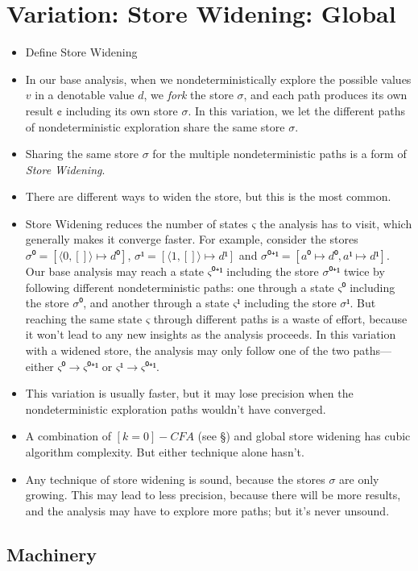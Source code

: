 \documentclass[12pt, oneside]{book}
\begin{document}
\section{Variation: Store Widening: Global}

\begin{itemize}
  \item Define Store Widening
  \item In our base analysis, when we nondeterministically explore the possible values \(v\) in a denotable value \(d\), we \emph{fork} the store \(σ\), and each path produces its own result \(¢\) including its own store \(σ\). In this variation, we let the different paths of nondeterministic exploration share the same store \(σ\).
  \item Sharing the same store \(σ\) for the multiple nondeterministic paths is a form of \emph{Store Widening}.
  \item There are different ways to widen the store, but this is the most common.
  \item Store Widening reduces the number of states \(ς\) the analysis has to visit, which generally makes it converge faster. For example, consider the stores \(σ⁰ = [⟨0, []⟩ ↦ d⁰]\), \(σ¹ = [⟨1, []⟩ ↦ d¹]\) and  \(σ⁰⁺¹ = [a⁰ ↦ d⁰, a¹ ↦ d¹]\). Our base analysis may reach a state \(ς⁰⁺¹\) including the store \(σ⁰⁺¹\) twice by following different nondeterministic paths: one through a state \(ς⁰\) including the store \(σ⁰\), and another through a state \(ς¹\) including the store \(σ¹\). But reaching the same state \(ς\) through different paths is a waste of effort, because it won’t lead to any new insights as the analysis proceeds. In this variation with a widened store, the analysis may only follow one of the two paths—either \(ς⁰ → ς⁰⁺¹\) or \(ς¹ → ς⁰⁺¹\).
  \item This variation is usually faster, but it may lose precision when the nondeterministic exploration paths wouldn’t have converged.
  \item A combination of \([k=0]-CFA\) (see §) and global store widening has cubic algorithm complexity. But either technique alone hasn’t.
  \item Any technique of store widening is sound, because the stores \(σ\) are only growing. This may lead to less precision, because there will be more results, and the analysis may have to explore more paths; but it’s never unsound.
\end{itemize}

\subsection{Machinery}
\end{document}
